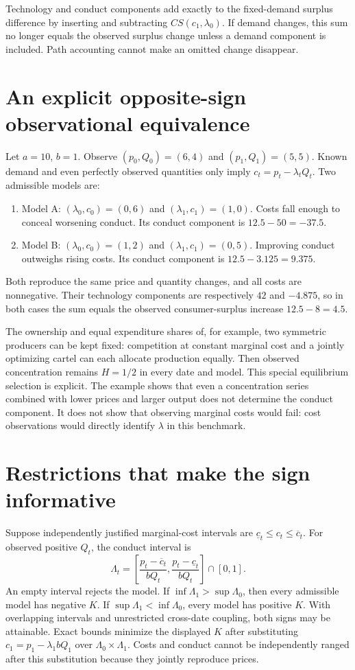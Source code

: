 \documentclass[11pt]{article}
\begin{document}
Technology and conduct components add exactly to the fixed-demand surplus difference by inserting and subtracting $CS(c_1,\lambda_0)$. If demand changes, this sum no longer equals the observed surplus change unless a demand component is included. Path accounting cannot make an omitted change disappear.

\section{An explicit opposite-sign observational equivalence}
Let $a=10$, $b=1$. Observe $(p_0,Q_0)=(6,4)$ and $(p_1,Q_1)=(5,5)$. Known demand and even perfectly observed quantities only imply
$c_t=p_t-\lambda_tQ_t$.
Two admissible models are:
\begin{enumerate}
\item Model A: $(\lambda_0,c_0)=(0,6)$ and $(\lambda_1,c_1)=(1,0)$. Costs fall enough to conceal worsening conduct. Its conduct component is $12.5-50=-37.5$.
\item Model B: $(\lambda_0,c_0)=(1,2)$ and $(\lambda_1,c_1)=(0,5)$. Improving conduct outweighs rising costs. Its conduct component is $12.5-3.125=9.375$.
\end{enumerate}
Both reproduce the same price and quantity changes, and all costs are nonnegative. Their technology components are respectively $42$ and $-4.875$, so in both cases the sum equals the observed consumer-surplus increase $12.5-8=4.5$.

The ownership and equal expenditure shares of, for example, two symmetric producers can be kept fixed: competition at constant marginal cost and a jointly optimizing cartel can each allocate production equally. Then observed concentration remains $H=1/2$ in every date and model. This special equilibrium selection is explicit. The example shows that even a concentration series combined with lower prices and larger output does not determine the conduct component. It does not show that observing marginal costs would fail: cost observations would directly identify $\lambda$ in this benchmark.

\section{Restrictions that make the sign informative}
Suppose independently justified marginal-cost intervals are $\underline c_t\leq c_t\leq\overline c_t$. For observed positive $Q_t$, the conduct interval is
\[
 \Lambda_t=\left[\frac{p_t-\overline c_t}{bQ_t},
                  \frac{p_t-\underline c_t}{bQ_t}\right]\cap[0,1].
\]
An empty interval rejects the model. If $\inf\Lambda_1>\sup\Lambda_0$, then every admissible model has negative $K$. If $\sup\Lambda_1<\inf\Lambda_0$, every model has positive $K$. With overlapping intervals and unrestricted cross-date coupling, both signs may be attainable. Exact bounds minimize the displayed $K$ after substituting $c_1=p_1-\lambda_1bQ_1$ over $\Lambda_0\times\Lambda_1$. Costs and conduct cannot be independently ranged after this substitution because they jointly reproduce prices.
\end{document}
